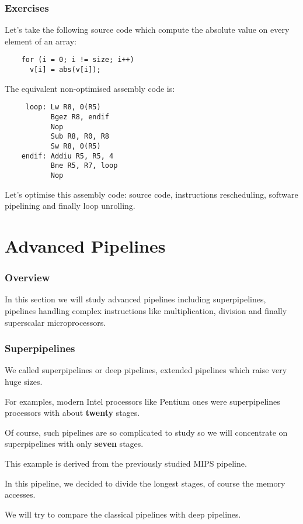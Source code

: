 
\begin{frame}[containsverbatim]
  \frametitle{Exercises}

  Let's take the following source code which compute the absolute value
  on every element of an array:

  \begin{verbatim}
    for (i = 0; i != size; i++)
      v[i] = abs(v[i]);
  \end{verbatim}

  The equivalent non-optimised assembly code is:

  \begin{verbatim}
     loop: Lw R8, 0(R5)
           Bgez R8, endif
           Nop
           Sub R8, R0, R8
           Sw R8, 0(R5)
    endif: Addiu R5, R5, 4
           Bne R5, R7, loop
           Nop
  \end{verbatim}

  Let's optimise this assembly code: source code, instructions rescheduling,
  software pipelining and finally loop unrolling.
\end{frame}

%
%

\section{Advanced Pipelines}


\begin{frame}
  \frametitle{Overview}

  In this section we will study advanced pipelines including superpipelines,
  pipelines handling complex instructions like multiplication, division
  and finally superscalar microprocessors.
\end{frame}


\begin{frame}
  \frametitle{Superpipelines}

  We called superpipelines or deep pipelines, extended pipelines which
  raise very huge sizes.

  \-

  For examples, modern Intel processors like Pentium ones were superpipelines
  processors with about \textbf{twenty} stages.

  \-

  Of course, such pipelines are so complicated to study so we will concentrate
  on superpipelines with only \textbf{seven} stages.

  \-

  This example is derived from the previously studied MIPS pipeline.

  \-

  In this pipeline, we decided to divide the longest stages, of course
  the memory accesses.

  \-

  We will try to compare the classical pipelines with deep pipelines.
\end{frame}

